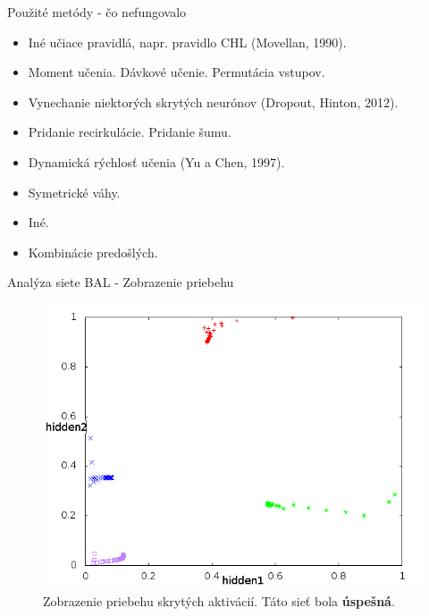 \documentclass[xcolor=dvipsnames]{beamer}
\begin{document}
\begin{frame}{Použité metódy - čo nefungovalo}
  \begin{itemize}
      \item Iné učiace pravidlá, napr. pravidlo CHL {\tiny (Movellan, 1990)}.
      \item Moment učenia. Dávkové učenie. Permutácia vstupov. 
      \item Vynechanie niektorých skrytých neurónov {\tiny (Dropout, Hinton, 2012)}. 
      \item Pridanie recirkulácie. Pridanie šumu.
      \item Dynamická rýchlosť učenia {\tiny (Yu a Chen, 1997)}. 
      \item Symetrické váhy. 
      \item Iné.
      \item Kombinácie predošlých. 
  \end{itemize} 
\end{frame} 

\begin{frame}{Analýza siete BAL - Zobrazenie priebehu}
  \begin{figure}[h!]  
    \centering
    \includegraphics[scale=0.4]{img/nice.png}
    \caption{{\small Zobrazenie priebehu skrytých aktivácií. Táto sieť bola {\bf úspešná}.}} 
  \end{figure} 
\end{frame} 
\end{document}

